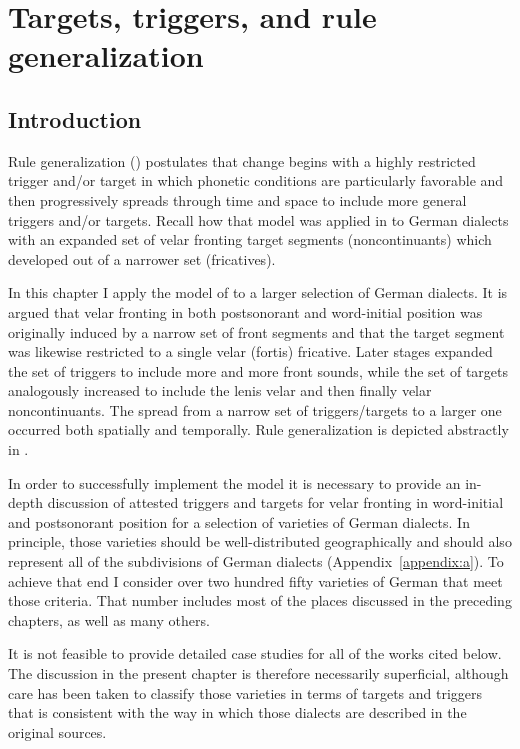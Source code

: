 \chapter{Targets, triggers, and rule generalization}\label{sec:12}

\section{Introduction}\label{sec:12.1}

Rule generalization () postulates that change begins with a highly restricted trigger and/or target in which phonetic conditions are particularly favorable and then progressively spreads through time and space to include more general triggers and/or targets. Recall how that model was applied in  to German dialects with an expanded set of velar fronting target segments (noncontinuants) which developed out of a narrower set (fricatives).

In this chapter I apply the model of  to a larger selection of German dialects. It is argued that velar fronting in both postsonorant and word-initial position was originally induced by a narrow set of front segments and that the target segment was likewise restricted to a single velar (fortis) fricative. Later stages expanded the set of triggers to include more and more front sounds, while the set of targets analogously increased to include the lenis velar and then finally velar noncontinuants. The spread from a narrow set of triggers/targets to a larger one occurred both spatially and temporally. Rule generalization is depicted abstractly in .

In order to successfully implement the  model it is necessary to provide an in-depth discussion of attested triggers and targets for velar fronting in word-initial and postsonorant position for a selection of varieties of German dialects. In principle, those varieties should be well-distributed geographically and should also represent all of the subdivisions of German dialects (Appendix~\ref{appendix:a}). To achieve that end I consider over two hundred fifty varieties of German that meet those criteria. That number includes most of the places discussed in the preceding chapters, as well as many others.

It is not feasible to provide detailed case studies for all of the works cited below. The discussion in the present chapter is therefore necessarily superficial, although care has been taken to classify those varieties in terms of targets and triggers that is consistent with the way in which those dialects are described in the original sources.

